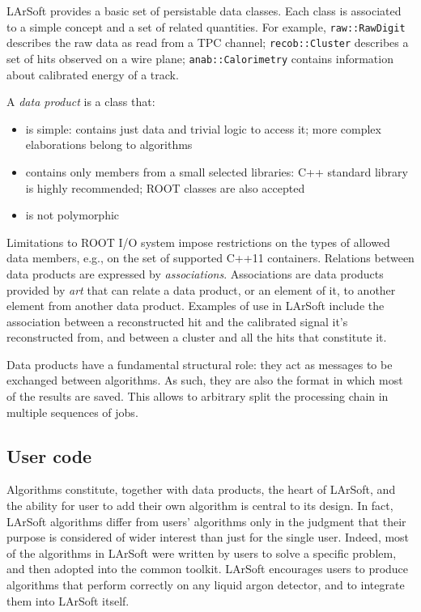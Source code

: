 \documentclass{article}
\begin{document}
LArSoft provides a basic set of persistable data classes. Each class is
associated to a simple concept and a set of related quantities. For
example, \texttt{raw::RawDigit} describes the raw data as read from a
TPC channel; \texttt{recob::Cluster} describes a set of hits observed on
a wire plane; \texttt{anab::Calorimetry} contains information about
calibrated energy of a track.

A \emph{data product} is a class that:

\begin{itemize}
\item
  is simple: contains just data and trivial logic to access it; more
  complex elaborations belong to algorithms
\item
  contains only members from a small selected libraries: C++ standard
  library is highly recommended; ROOT classes are also accepted
\item
  is not polymorphic
\end{itemize}

Limitations to ROOT I/O system impose restrictions on the types of
allowed data members, e.g., on the set of supported C++11 containers.
Relations between data products are expressed by \emph{associations}.
Associations are data products provided by \emph{art} that can relate a
data product, or an element of it, to another element from another data
product. Examples of use in LArSoft include the association between a
reconstructed hit and the calibrated signal it's reconstructed from, and
between a cluster and all the hits that constitute it.

Data products have a fundamental structural role: they act as messages
to be exchanged between algorithms. As such, they are also the format in
which most of the results are saved. This allows to arbitrary split the
processing chain in multiple sequences of jobs.

\subsection{User code}\label{user-code}

Algorithms constitute, together with data products, the heart of
LArSoft, and the ability for user to add their own algorithm is central
to its design. In fact, LArSoft algorithms differ from users' algorithms
only in the judgment that their purpose is considered of wider interest
than just for the single user. Indeed, most of the algorithms in LArSoft
were written by users to solve a specific problem, and then adopted into
the common toolkit. LArSoft encourages users to produce algorithms that
perform correctly on any liquid argon detector, and to integrate them
into LArSoft itself.
\end{document}
